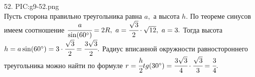 52. {{PIC:g9-52.png}}\\
Пусть сторона правильно треугольника равна $a,$ а высота $h.$ По теореме синусов имеем соотношение $\cfrac{a}{\sin(60^\circ)}=2R,\ a=\cfrac{\sqrt{3}}{2}\cdot\sqrt{12},\ a=3.$ Тогда высота $h=a\sin(60^\circ)=3\cdot\cfrac{\sqrt{3}}{2}=\cfrac{3\sqrt{3}}{2}.$ Радиус вписанной окружности равностороннего треугольника можно найти по формуле $r=\cfrac{h}{2}tg(30^\circ)=\cfrac{3\sqrt{3}}{4}\cdot\cfrac{\sqrt{3}}{3}=\cfrac{3}{4}.$\\
